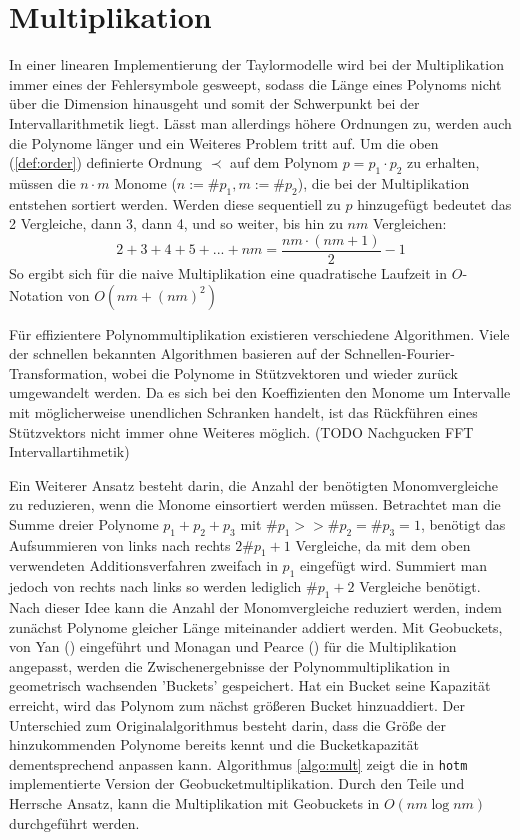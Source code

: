 \section{Multiplikation}
In einer linearen Implementierung der Taylormodelle wird bei der Multiplikation immer eines der Fehlersymbole gesweept, sodass die Länge eines Polynoms nicht über die Dimension hinausgeht und somit der Schwerpunkt bei der Intervallarithmetik liegt. Lässt man allerdings höhere Ordnungen zu, werden auch die Polynome länger und ein Weiteres Problem tritt auf. Um die oben (\ref{def:order}) definierte Ordnung $\prec$ auf dem Polynom $p = p_1 \cdot p_2$ zu erhalten, müssen die $n\cdot m$ Monome ($n := \#p_1, m := \#p_2$), die bei der Multiplikation entstehen sortiert werden. Werden diese sequentiell zu $p$ hinzugefügt bedeutet das 2 Vergleiche, dann 3, dann 4, und so weiter, bis hin zu $nm$ Vergleichen:
$$ 2 + 3 + 4 + 5 + ... + nm = \frac{nm \cdot (nm + 1)}{2} - 1$$
So ergibt sich für die naive Multiplikation eine quadratische Laufzeit in $O$-Notation von $O(nm + (nm)^2)$
\par
Für effizientere Polynommultiplikation existieren verschiedene Algorithmen. Viele der schnellen bekannten Algorithmen basieren  auf der Schnellen-Fourier-Transformation, wobei die Polynome in Stützvektoren und wieder zurück umgewandelt werden. Da es sich bei den Koeffizienten den Monome um Intervalle mit möglicherweise unendlichen Schranken handelt, ist das Rückführen eines Stützvektors nicht immer ohne Weiteres möglich. (TODO Nachgucken FFT Intervallartihmetik) \par
Ein Weiterer Ansatz besteht darin, die Anzahl der benötigten Monomvergleiche zu reduzieren, wenn die Monome einsortiert werden müssen. Betrachtet man die Summe dreier Polynome $p_1 + p_2 + p_3$ mit $\#p_1 >> \#p_2 = \#p_3 = 1$, benötigt das Aufsummieren von links nach rechts $2\#p_1 + 1$ Vergleiche, da mit dem oben verwendeten Additionsverfahren zweifach in $p_1$ eingefügt wird. Summiert man jedoch von rechts nach links so werden lediglich $\#p_1 + 2$ Vergleiche benötigt. Nach dieser Idee kann die Anzahl der Monomvergleiche reduziert werden, indem zunächst Polynome gleicher Länge miteinander addiert werden. Mit Geobuckets, von Yan (\cite{geobuckets}) eingeführt und Monagan und Pearce (\cite{geobucketsmulti}) für die Multiplikation angepasst, werden die Zwischenergebnisse der Polynommultiplikation in geometrisch wachsenden 'Buckets' gespeichert. Hat ein Bucket seine Kapazität erreicht, wird das Polynom zum nächst größeren Bucket hinzuaddiert. Der Unterschied zum Originalalgorithmus besteht darin, dass die Größe der hinzukommenden Polynome bereits kennt und die Bucketkapazität dementsprechend anpassen kann. Algorithmus \ref{algo:mult} zeigt die in \verb+hotm+ implementierte Version der Geobucketmultiplikation. Durch den Teile und Herrsche Ansatz, kann die Multiplikation mit Geobuckets in $O(nm \log nm)$ durchgeführt werden.  \par
